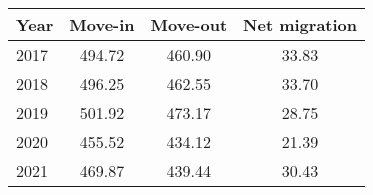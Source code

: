 \begin{table}
\centering
\begin{tabular}{lccc}
	\hline\hline
	Year	& Move-in	& Move-out	& Net migration\\
	\hline
	2017	&494.72	&460.90	&33.83\\
	2018	&496.25	&462.55	&33.70\\
	2019	&501.92	&473.17	&28.75\\
	2020	&455.52	&434.12	&21.39\\
	2021	&469.87	&439.44	&30.43\\
	\hline\hline
\end{tabular}
\end{table}
